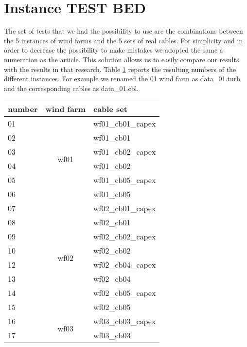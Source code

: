 \section{Instance TEST BED}
The set of tests that we had the possibility to use are the combinations between the 5 instances of wind farms and the 5 sets of real cables. For simplicity and in order to decrease the possibility to make mistakes we adopted the same a numeration as the \cite{wfcp} article. This solution allows us to easily compare our results with the results in that research. 
Table \ref{tab:testBed} reports the resulting numbers of the different instances. For example we renamed the 01 wind farm as data\_01.turb and the corresponding cables as data\_01.cbl. 

\begin{table}[!htbp]\label{tab:testBed}
\center
\begin{tabular}{lcl}
\hline
number & \multicolumn{1}{l}{wind farm} & cable set         \\ \hline
01     & \multirow{6}{*}{wf01}         & wf01\_cb01\_capex \\
02     &                               & wf01\_cb01        \\
03     &                               & wf01\_cb02\_capex \\
04     &                               & wf01\_cb02        \\
05     &                               & wf01\_cb05\_capex \\
06     &                               & wf01\_cb05        \\ \hline
07     & \multirow{8}{*}{wf02}         & wf02\_cb01\_capex \\
08     &                               & wf02\_cb01        \\
09     &                               & wf02\_cb02\_capex \\
10     &                               & wf02\_cb02        \\
12     &                               & wf02\_cb04\_capex \\
13     &                               & wf02\_cb04        \\
14     &                               & wf02\_cb05\_capex \\
15     &                               & wf02\_cb05        \\ \hline
16     & \multirow{4}{*}{wf03}         & wf03\_cb03\_capex \\
17     &                               & wf03\_cb03        \\

\end{tabular}
\end{table}
